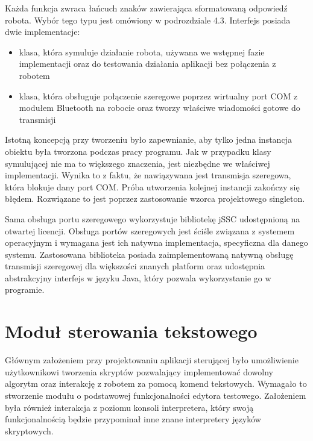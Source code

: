 \documentclass[eng,printmode]{mgr}
\begin{document}
Każda funkcja zwraca łańcuch znaków zawierająca sformatowaną odpowiedź robota. Wybór tego typu jest omówiony w podrozdziale 4.3.  Interfejs posiada dwie implementacje:

\begin{itemize}
  \item klasa, która symuluje działanie robota, używana we wstępnej fazie implementacji oraz do testowania działania aplikacji bez połączenia z robotem
  \item klasa, która obsługuje połączenie szeregowe poprzez wirtualny port COM z modułem Bluetooth na robocie oraz tworzy właściwe wiadomości gotowe do transmisji
\end{itemize}

Istotną koncepcją przy tworzeniu było zapewnianie, aby tylko jedna instancja obiektu była tworzona podczas pracy programu. Jak w przypadku klasy symulującej nie ma to większego znaczenia, jest niezbędne we właściwej implementacji. Wynika to z faktu, że nawiązywana jest transmisja szeregowa, która blokuje dany port COM. Próba utworzenia kolejnej instancji zakończy się błędem. Rozwiązane to jest poprzez zastosowanie wzorca projektowego singleton. 

Sama obsługa portu szeregowego wykorzystuje bibliotekę jSSC udostępnioną na otwartej licencji. Obsługa portów szeregowych jest ściśle związana z systemem operacyjnym  i wymagana jest ich natywna implementacja, specyficzna dla danego systemu. Zastosowana biblioteka posiada zaimplementowaną natywną obsługę transmisji szeregowej dla większości znanych platform oraz udostępnia abstrakcyjny interfejs w języku Java, który pozwala wykorzystanie go w programie.

 \section{Moduł sterowania tekstowego}
Głównym założeniem przy projektowaniu aplikacji sterującej było umożliwienie użytkownikowi tworzenia skryptów pozwalający implementować dowolny algorytm oraz interakcję z robotem za pomocą komend tekstowych. Wymagało to stworzenie modułu o podstawowej funkcjonalności edytora testowego. Założeniem była również interakcja z poziomu konsoli interpretera, który swoją funkcjonalnością będzie przypominał inne znane interpretery języków skryptowych.
\end{document}
